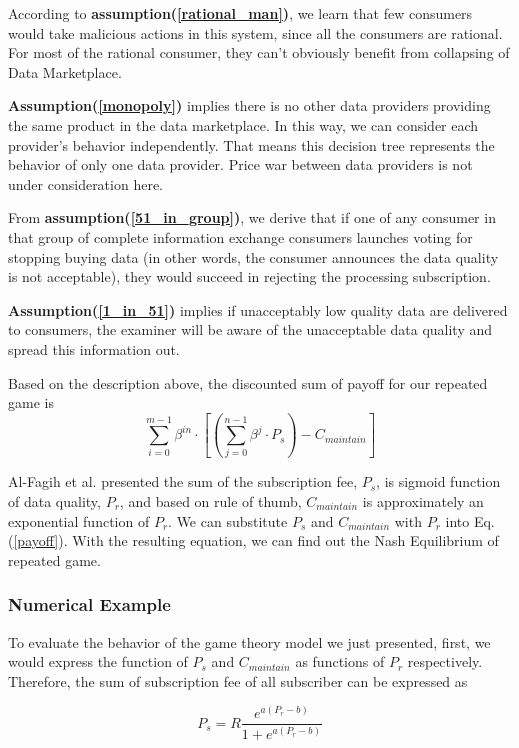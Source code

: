 \documentclass[journal,article,applsci,submit,moreauthors,pdftex]{Definitions/mdpi}
\begin{document}
According to \textbf{assumption(\ref{rational_man})}, we learn that few consumers would take malicious actions in this system, since all the consumers are rational. For most of the rational consumer, they can't obviously benefit from collapsing of Data Marketplace.

\textbf{Assumption(\ref{monopoly})} implies there is no other data providers providing the same product in the data marketplace. In this way, we can consider each provider's behavior independently. That means this decision tree represents the behavior of only one data provider. Price war between data providers is not under consideration here.

From \textbf{assumption(\ref{51_in_group})}, we derive that if one of any consumer in that group of complete information exchange consumers launches voting for stopping buying data (in other words, the consumer announces the data quality is not acceptable), they would succeed in rejecting the processing subscription.

\textbf{Assumption(\ref{1_in_51})} implies if unacceptably low quality data are delivered to consumers, the examiner will be aware of the unacceptable data quality and spread this information out.


Based on the description above, the discounted sum of payoff for our repeated game is
\begin{equation} \label{payoff}
    \sum_{i=0}^{m - 1}{\beta^{in}\cdot [(\sum_{j=0}^{n - 1} \beta^j \cdot P_s) - C_{maintain}]}
\end{equation}

Al-Fagih et al. presented\cite{DataPrice} the sum of the subscription fee, $P_s$, is sigmoid function of data quality, $P_r$, and based on rule of thumb, $C_{maintain}$ is approximately an exponential function of $P_r$. We can substitute $P_s$ and $C_{maintain}$ with $P_r$ into Eq. (\ref{payoff}). With the resulting equation, we can find out the Nash Equilibrium of repeated game.

\subsubsection{Numerical Example}
To evaluate the behavior of the game theory model we just presented, first, we would express the function of $P_s$ and $C_{maintain}$ as functions of $P_r$ respectively. Therefore, the sum of subscription fee of all subscriber can be expressed as

\begin{equation} \label{sub_fee}
    P_s = R \frac{e^{a (P_r - b)}}{1 + e^{a (P_r - b)}}
\end{equation}
\end{document}
